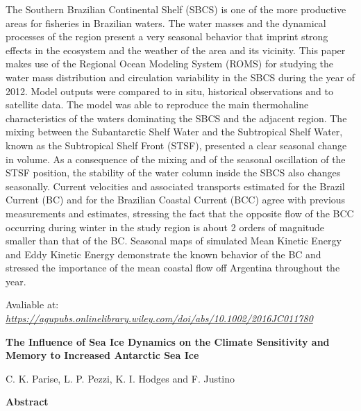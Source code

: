  The Southern Brazilian Continental Shelf (SBCS) is one of the more productive areas for fisheries in Brazilian waters. The water masses and the dynamical processes of the region 
          present a very seasonal behavior that imprint strong effects in the ecosystem and the weather of the area and its vicinity. This paper makes use of the Regional Ocean Modeling System (ROMS) 
          for studying the water mass distribution and circulation variability in the SBCS during the year of 2012. Model outputs were compared to in situ, historical observations and to satellite data. 
          The model was able to reproduce the main thermohaline characteristics of the waters dominating the SBCS and the adjacent region. The mixing between the Subantarctic Shelf Water and the Subtropical
          Shelf Water, known as the Subtropical Shelf Front (STSF), presented a clear seasonal change in volume. As a consequence of the mixing and of the seasonal oscillation of the STSF position, 
          the stability of the water column inside the SBCS also changes seasonally. Current velocities and associated transports estimated for the Brazil Current (BC) and for the Brazilian Coastal Current 
          (BCC) agree with previous measurements and estimates, stressing the fact that the opposite flow of the BCC occurring during winter in the study region is about 2 orders of magnitude smaller than that
           of the BC. Seasonal maps of simulated Mean Kinetic Energy and Eddy Kinetic Energy demonstrate the known behavior of the BC and stressed the importance of the mean coastal flow off Argentina throughout the year.
\bigskip

\bigskip

 Avaliable at: \textcolor{bleu_cite}{\href{https://agupubs.onlinelibrary.wiley.com/doi/abs/10.1002/2016JC011780}{\textit{https://agupubs.onlinelibrary.wiley.com/doi/abs/10.1002/2016JC011780}}}

\bigskip


\newpage
\bigskip

 \begin{center} \textbf{The Influence of Sea Ice Dynamics on the Climate Sensitivity and Memory to Increased Antarctic Sea Ice}
\bigskip

 C. K. Parise, L. P. Pezzi, K. I. Hodges and F. Justino
\bigskip

 \textbf{Abstract}\end{center}
\bigskip

